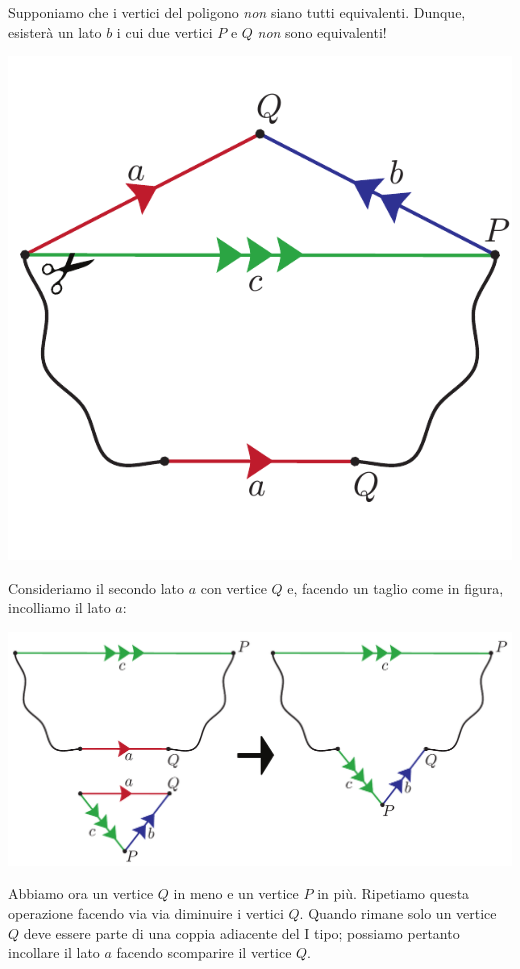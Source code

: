 \begin{demonstration}
Supponiamo che i vertici del poligono \textit{non} siano tutti equivalenti. Dunque, esisterà un lato $b$ i cui due vertici $P$ e $Q$ \textit{non} sono equivalenti! 
\begin{center}
	\includegraphics[trim=0cm 0cm 0cm 0cm, clip, scale=0.35]{images/cutandpastealgorithmstep2-1.pdf}
\end{center}
Consideriamo il secondo lato $a$ con vertice $Q$ e, facendo un taglio come in figura, incolliamo il lato $a$:
\begin{center}
	\includegraphics[trim=0cm 0cm 0cm 0cm, clip, scale=0.35]{images/cutandpastealgorithmstep2-2.pdf}
\end{center}
Abbiamo ora un vertice $Q$ in meno e un vertice $P$ in più. Ripetiamo questa operazione facendo via via diminuire i vertici $Q$. Quando rimane solo un vertice $Q$ deve essere parte di una coppia adiacente del I tipo; possiamo pertanto incollare il lato $a$ facendo scomparire il vertice $Q$.\\

\end{demonstration}
